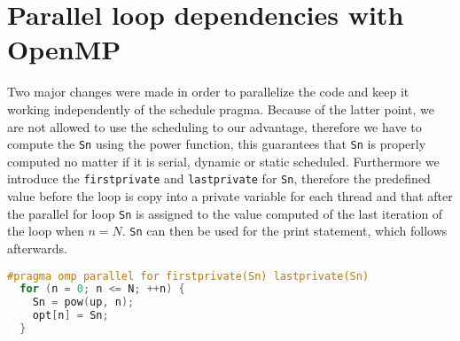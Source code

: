 \section{Parallel loop dependencies with OpenMP}
Two major changes were made in order to parallelize the code and keep it working independently of the schedule pragma. Because of the latter point, we are not allowed to use the scheduling to our advantage, therefore we have to compute the \texttt{Sn} using the power function, this guarantees that \texttt{Sn} is properly computed no matter if it is serial, dynamic or static scheduled.\newline
Furthermore we introduce the \texttt{firstprivate} and \texttt{lastprivate} for \texttt{Sn}, therefore the predefined value before the loop is copy into a private variable for each thread and that after the parallel for loop \texttt{Sn} is assigned to the value computed of the last iteration of the loop when $n=N$. \texttt{Sn} can then be used for the print statement, which follows afterwards. 
\begin{lstlisting}[language=C++, caption=Parallelized section of recur\_omp.c, label=lst:ldp]
#pragma omp parallel for firstprivate(Sn) lastprivate(Sn)
  for (n = 0; n <= N; ++n) {
    Sn = pow(up, n);
    opt[n] = Sn;
  }
\end{lstlisting}


